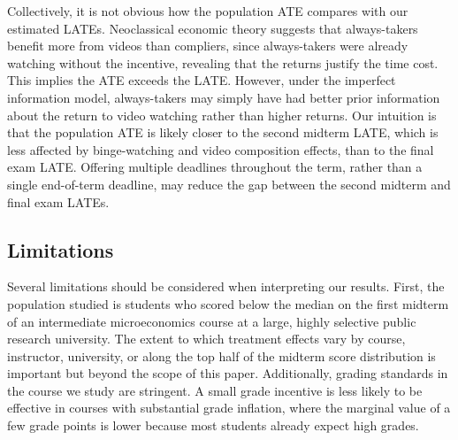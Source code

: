 Collectively, it is not obvious how the population ATE compares with our estimated LATEs.
Neoclassical economic theory suggests that always-takers benefit more from videos than compliers, since always-takers were already watching without the incentive, revealing that the returns justify the time cost.
This implies the ATE exceeds the LATE.
However, under the imperfect information model, always-takers may simply have had better prior information about the return to video watching rather than higher returns.
Our intuition is that the population ATE is likely closer to the second midterm LATE, which is less affected by binge-watching and video composition effects, than to the final exam LATE.
Offering multiple deadlines throughout the term, rather than a single end-of-term deadline, may reduce the gap between the second midterm and final exam LATEs.

\subsection{Limitations}\label{subsec:limitations}

Several limitations should be considered when interpreting our results.
First, the population studied is students who scored below the median on the first midterm of an intermediate microeconomics course at a large, highly selective public research university.
The extent to which treatment effects vary by course, instructor, university, or along the top half of the midterm score distribution is important but beyond the scope of this paper.
Additionally, grading standards in the course we study are stringent.
A small grade incentive is less likely to be effective in courses with substantial grade inflation, where the marginal value of a few grade points is lower because most students already expect high grades.

